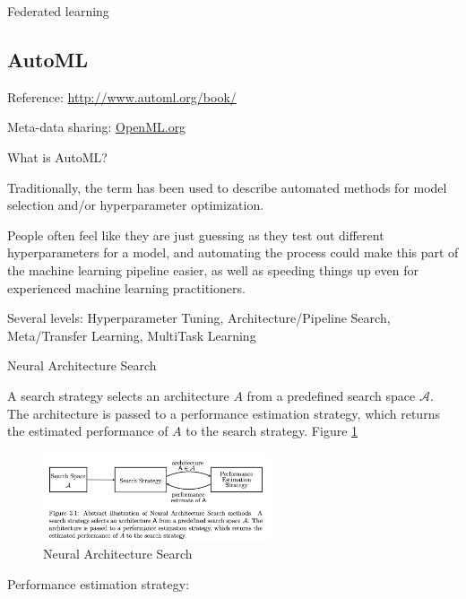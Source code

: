 \documentclass[english]{article}
\begin{document}
\item Federated learning



\eenum 



\subsection{AutoML}


\benum 

\item Reference: \url{http://www.automl.org/book/}

Meta-data sharing: \url{OpenML.org}

\item What is AutoML?

Traditionally, the term has been used to describe automated methods for model selection and/or hyperparameter optimization.

People often feel like they are just guessing as they test out different hyperparameters for a model, and automating the process could make this part of the machine learning pipeline easier, as well as speeding things up even for experienced machine learning practitioners.

\item Several levels: Hyperparameter Tuning, Architecture/Pipeline Search, Meta/Transfer Learning, MultiTask Learning

\item Neural Architecture Search

\benum 
\item A search strategy selects an architecture $A$ from a predefined search space $\mathcal{A}$. The architecture is passed to a performance estimation strategy, which returns the estimated performance of $A$ to the search strategy. Figure \ref{nas} 

\begin{figure}[h!]
  \centering
  \includegraphics[width=0.6\textwidth]{nas.png}
  \caption{Neural Architecture Search}
  \label{nas}
\end{figure}

Performance estimation strategy: 
\end{document}

